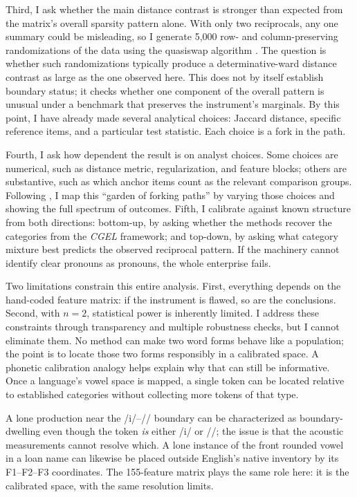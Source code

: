 \documentclass[12pt]{article}
\begin{document}
Third, I ask whether the main distance contrast is stronger than expected from the matrix's overall sparsity pattern alone. With only two reciprocals, any one summary could be misleading, so I generate 5,000 row- and column-preserving randomizations of the data using the quasiswap algorithm \parencite{miklos2004randomization}. The question is whether such randomizations typically produce a determinative-ward distance contrast as large as the one observed here. This does not by itself establish boundary status; it checks whether one component of the overall pattern is unusual under a benchmark that preserves the instrument's marginals. By this point, I have already made several analytical choices: Jaccard distance, specific reference items, and a particular test statistic. Each choice is a fork in the path.

Fourth, I ask how dependent the result is on analyst choices. Some choices are numerical, such as distance metric, regularization, and feature blocks; others are substantive, such as which anchor items count as the relevant comparison groups. Following \textcite{GelmanLoken2013}, I map this \enquote{garden of forking paths} by varying those choices and showing the full spectrum of outcomes. Fifth, I calibrate against known structure from both directions: bottom-up, by asking whether the methods recover the categories from the \textit{CGEL} framework; and top-down, by asking what category mixture best predicts the observed reciprocal pattern. If the machinery cannot identify clear pronouns as pronouns, the whole enterprise fails.

Two limitations constrain this entire analysis. First, everything depends on the hand-coded feature matrix: if the instrument is flawed, so are the conclusions. Second, with $n = 2$, statistical power is inherently limited. I address these constraints through transparency and multiple robustness checks, but I cannot eliminate them. No method can make two word forms behave like a population; the point is to locate those two forms responsibly in a calibrated space. A phonetic calibration analogy helps explain why that can still be informative. Once a language's vowel space is mapped, a single token can be located relative to established categories without collecting more tokens of that type.

A lone production near the /i/--// boundary can be characterized as boundary-dwelling even though the token \emph{is} either /i/ or //; the issue is that the acoustic measurements cannot resolve which. A lone instance of the front rounded vowel \textipa{[y]} in a loan name can likewise be placed outside English's native inventory by its F1--F2--F3 coordinates. The 155-feature matrix plays the same role here: it is the calibrated space, with the same resolution limits.
\end{document}
